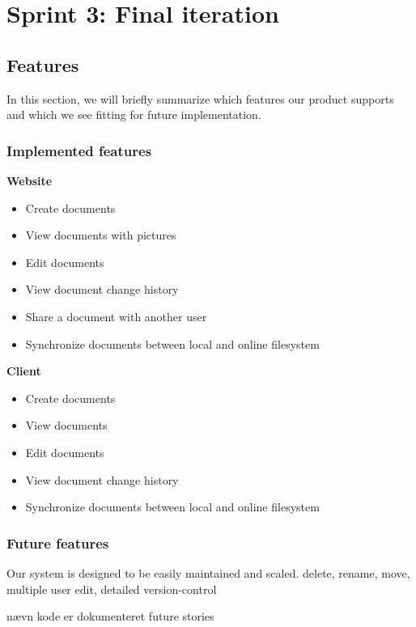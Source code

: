 \section{Sprint 3: Final iteration}





\subsection{Features}
In this section, we will briefly summarize which features our product supports and which we see fitting for future implementation.
\subsubsection{Implemented features}
\textbf{Website}
\begin{itemize}
\item Create documents
\item View documents with pictures
\item Edit documents
\item View document change history
\item Share a document with another user
\item Synchronize documents between local and online filesystem
\end{itemize}
\textbf{Client}
\begin{itemize}
\item Create documents
\item View documents
\item Edit documents
\item View document change history
\item Synchronize documents between local and online filesystem
\end{itemize}
\subsubsection{Future features}
Our system is designed to be easily maintained and scaled. 
delete, rename, move, multiple user edit, detailed version-control
\newpage

nævn kode er dokumenteret
future stories